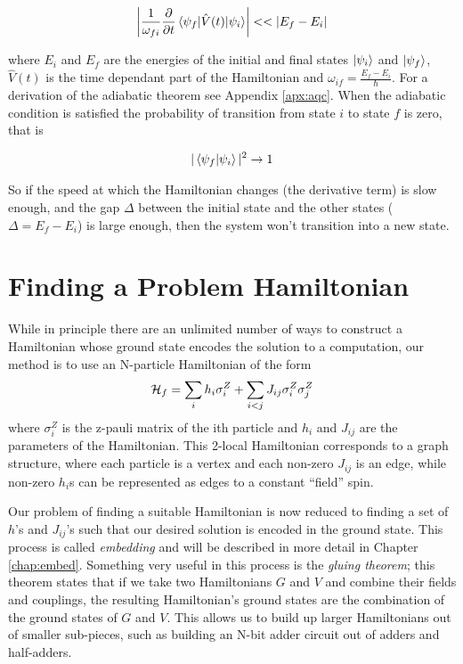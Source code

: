 \begin{equation}
	\left | \frac{1}{\omega_{fi}}\frac{\partial}{\partial t} \mathinner{\langle{\psi_f | \hat{V}(t) | \psi_i}\rangle} \right | << |E_f - E_i|
\end{equation}

where $E_i$ and $E_f$ are the energies of the initial and final states $\mathinner{|{\psi_i}\rangle}$ and $\mathinner{|{\psi_f}\rangle}$, $\hat{V}(t)$ is the time dependant part of the Hamiltonian and $\omega_{if} = \frac{E_f - E_i}{\hbar}$.  For a derivation of the adiabatic theorem see Appendix \ref{apx:aqc}.\cite{zettili}  When the adiabatic condition is satisfied the probability of transition from state $i$ to state $f$ is zero, that is

\begin{equation}
	|\mathinner{\langle{\psi_f|\psi_i}\rangle}|^2 \rightarrow 1
\end{equation}

So if the speed at which the Hamiltonian changes (the derivative term) is slow enough, and the gap $\Delta$ between the initial state and the other states ($\Delta = E_f - E_i$) is large enough, then the system won't transition into a new state.  

\section{Finding a Problem Hamiltonian}
\label{sec:prob_ham}
While in principle there are an unlimited number of ways to construct a Hamiltonian whose ground state encodes the solution to a computation, our method is to use an N-particle Hamiltonian of the form
\begin{equation}
	\label{eq:ham}
	\mathcal{H}_f = \sum_{i} h_i \sigma_i^Z + \sum_{i < j} J_{ij} \sigma_i^Z\sigma_j^Z 
\end{equation}
where $\sigma_i^Z$ is the z-pauli matrix of the ith particle and $h_i$ and $J_{ij}$ are the parameters of the Hamiltonian.  
This 2-local Hamiltonian corresponds to a graph structure, where each particle is a vertex and each non-zero $J_{ij}$ is an edge, while non-zero $h_i$s can be represented as edges to a constant ``field'' spin.

Our problem of finding a suitable Hamiltonian is now reduced to finding a set of $h$'s and $J_{ij}$'s such that our desired solution is encoded in the ground state.  This process is called \emph{embedding} and will be described in more detail in Chapter \ref{chap:embed}.  Something very useful in this process is the \emph{gluing theorem}; this theorem states that if we take two Hamiltonians $G$ and $V$ and combine their fields and couplings, the resulting Hamiltonian's ground states are the combination of the ground states of $G$ and $V$.  This allows us to build up larger Hamiltonians out of smaller sub-pieces, such as building an N-bit adder circuit out of adders and half-adders.

